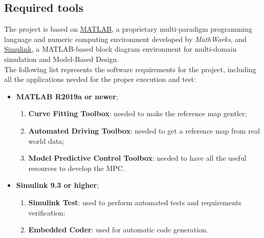 \subsection{Required tools}
The project is based on \href{https://www.mathworks.com/help/matlab/index.html?s_tid=srchtitle}{\underline{MATLAB}}, a proprietary multi-paradigm programming language and numeric computing environment developed by \textit{MathWorks}, and \href{https://www.mathworks.com/help/simulink/index.html?s_tid=CRUX_lftnav}{\underline{Simulink}}, a MATLAB-based block diagram environment for multi-domain simulation and Model-Based Design.\\
The following list represents the software requirements for the project, including all the applications needed for the proper execution and test:
\begin{itemize}
    \item \textbf{MATLAB R2019a or newer};
    \begin{enumerate}
            \item \textbf{Curve Fitting Toolbox}: needed to make the reference map gentler;
            \item \textbf{Automated Driving Toolbox}: needed to get a reference map from real world data;
            \item \textbf{Model Predictive Control Toolbox}: needed to have all the useful resources to develop the MPC.
    \end{enumerate}
    \item \textbf{Simulink 9.3 or higher};
    \begin{enumerate}
            \item \textbf{Simulink Test}: used to perform automated tests and requirements verification;
            \item \textbf{Embedded Coder}: used for automatic code generation.
    \end{enumerate}
    
\end{itemize}




